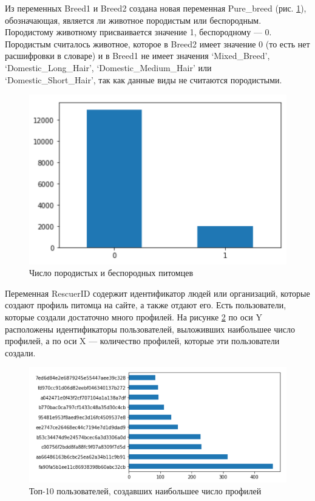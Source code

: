 \documentclass[14pt]{mmcs_article}
\begin{document}
Из переменных Breed1 и Breed2 создана новая переменная Pure\_breed (рис. \ref{analyse:purebreed}), обозначающая, является ли животное породистым или беспородным. Породистому животному присваивается значение 1, беспородному --- 0. Породистым считалось животное, которое в Breed2 имеет значение 0 (то есть нет расшифровки в словаре) и в Breed1 не имеет значения `Mixed\_Breed', `Domestic\_Long\_Hair', `Domestic\_Medium\_Hair' или \\ `Domestic\_Short\_Hair', так как данные виды не считаются породистыми.

\begin{figure}[H]
	\centering
	\includegraphics[scale=1]{purebreed.png}
	\caption{Число породистых и беспородных питомцев}\label{analyse:purebreed}
\end{figure}

Переменная RescuerID содержит идентификатор людей или организаций, которые создают профиль питомца на сайте, а также отдают его. Есть пользователи, которые создали достаточно много профилей. На рисунке \ref{analyse:toprescuer} по оси Y расположены идентификаторы пользователей, выложивших наибольшее число профилей, а по оси X --- количество профилей, которые эти пользователи создали.

\begin{figure}[H]
	\centering
	\includegraphics[scale=1]{toprescuer.png}
	\caption{Топ-10 пользователей, создавших наибольшее число профилей}\label{analyse:toprescuer}
\end{figure}
\end{document}
